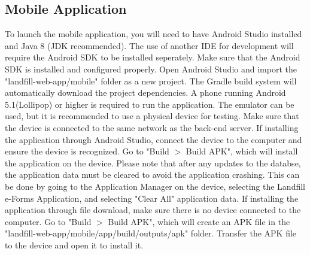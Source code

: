 \documentclass[12pt]{article}
\begin{document}
\subsection{Mobile Application}
To launch the mobile application, you will need to have Android Studio installed and Java 8 (JDK recommended). The use of another IDE for development will require the Android SDK to be installed seperately. Make sure that the Android SDK is installed and configured properly.\newline
Open Android Studio and import the "landfill-web-app/mobile" folder as a new project. The Gradle build system will automatically download the project dependencies. \newline
A phone running Android 5.1(Lollipop) or higher is required to run the application. The emulator can be used, but it is recommended to use a physical device for testing. Make sure that the device is connected to the same network as the back-end server.\newline
If installing the application through Android Studio, connect the device to the computer and ensure the device is recognized. Go to "Build $>$ Build APK", which will install the application on the device.\newline
Please note that after any updates to the databse, the application data must be cleared to avoid the application crashing. This can be done by going to the Application Manager on the device, selecting the Landfill e-Forms Application, and selecting "Clear All" application data.\newline
If installing the application through file download, make sure there is no device connected to the computer. Go to "Build $>$ Build APK", which will create an APK file in the "landfill-web-app/mobile/app/build/outputs/apk" folder. Transfer the APK file to the device and open it to install it. 
\end{document}
